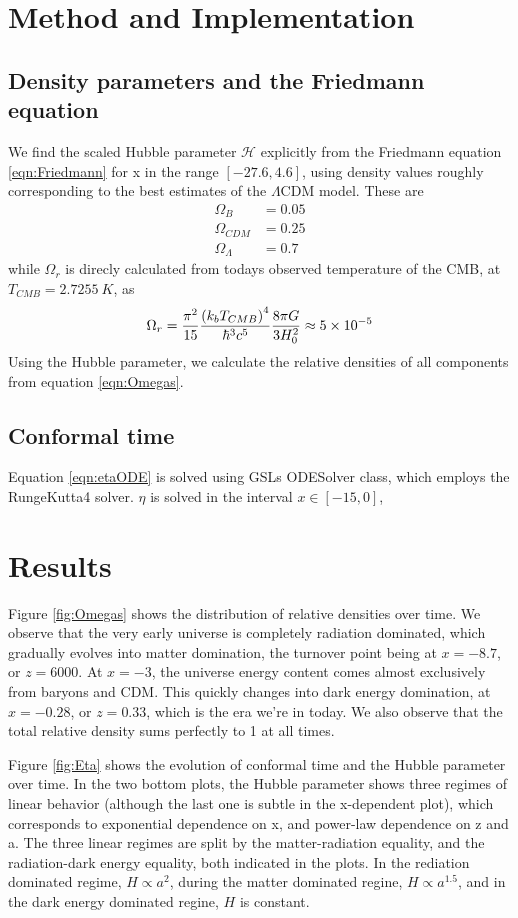 \documentclass[10pt, a4paper]{article}
\begin{document}
\section{Method and Implementation}
\subsection{Density parameters and the Friedmann equation}
We find the scaled Hubble parameter $\mathcal{H}$ explicitly from the Friedmann equation \ref{eqn:Friedmann} for x in the range $[-27.6, 4.6]$, using density values roughly corresponding to the best estimates of the $\Lambda$CDM model. These are
\begin{align*}
    \Omega_B &= 0.05 \\
    \Omega_{CDM} &= 0.25 \\
    \Omega_{\Lambda} &= 0.7
\end{align*}
while $\Omega_r$ is direcly calculated from todays observed temperature of the CMB, at $T_{CMB} = \SI{2.7255}{K}$, as
\begin{align*}
    \Omega_r = \frac{\pi^2}{15}\frac{\qty(k_bT_{CMB})^4}{\hbar^3c^5}\frac{8\pi G}{3H_0^2} \approx 5\times 10^{-5}
\end{align*}
Using the Hubble parameter, we calculate the relative densities of all components from equation \ref{eqn:Omegas}.


\subsection{Conformal time}
Equation \ref{eqn:etaODE} is solved using GSLs ODESolver class, which employs the RungeKutta4 solver. $\eta$ is solved in the interval $x \in [-15, 0]$,


\section{Results}
Figure \ref{fig:Omegas} shows the distribution of relative densities over time. We observe that the very early universe is completely radiation dominated, which gradually evolves into matter domination, the turnover point being at $x=-8.7$, or $z=6000$. At $x=-3$, the universe energy content comes almost exclusively from baryons and CDM. This quickly changes into dark energy domination, at $x=-0.28$, or $z=0.33$, which is the era we're in today. We also observe that the total relative density sums perfectly to 1 at all times.

Figure \ref{fig:Eta} shows the evolution of conformal time and the Hubble parameter over time. In the two bottom plots, the Hubble parameter shows three regimes of linear behavior (although the last one is subtle in the x-dependent plot), which corresponds to exponential dependence on x, and power-law dependence on z and a. The three linear regimes are split by the matter-radiation equality, and the radiation-dark energy equality, both indicated in the plots. In the rediation dominated regime, $H \propto a^2$, during the matter dominated regine, $H \propto a^{1.5}$, and in the dark energy dominated regine, $H$ is constant.
\end{document}
